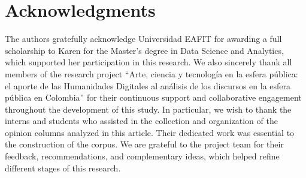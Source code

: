 \documentclass[11pt,a4paper]{article}
\begin{document}
	\section*{Acknowledgments}
	The authors gratefully acknowledge Universidad EAFIT for awarding a full scholarship to Karen for the Master’s degree in Data Science and Analytics, which supported her participation in this research.
	We also sincerely thank all members of the research project “Arte, ciencia y tecnología en la esfera pública: el aporte de las Humanidades Digitales al análisis de los discursos en la esfera pública en Colombia” for their continuous support and collaborative engagement throughout the development of this study.
	In particular, we wish to thank the interns and students who assisted in the collection and organization of the opinion columns analyzed in this article. Their dedicated work was essential to the construction of the corpus.
	We are grateful to the project team for their feedback, recommendations, and complementary ideas, which helped refine different stages of this research.
	

	
	\printbibliography[title={Works Cited}]
	

	
\end{document}
